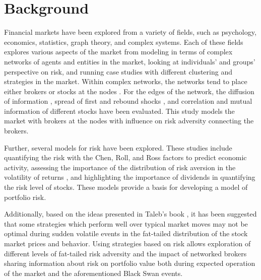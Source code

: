 \documentclass[letterpaper, 11 pt, proceedings]{IEEEtran}
\begin{document}
	\section{Background}\label{sec:background}
	Financial markets have been explored from a variety of fields, such as psychology, economics, statistics, graph theory, and complex systems. Each of these fields explores various aspects of the market  from modeling in terms of complex networks of agents and entities in the market, looking at individuals' and groups' perspective on risk, and running case studies with different clustering and strategies in the market. Within complex networks, the networks tend to place either brokers or stocks at the nodes \cite{baydelli_hierarchicalmarket,kulmann_marketscomplexsystems,dimaggio_relevancebrokernetworks,tse_networkstocks}. For the edges of the network, the diffusion of information \cite{dimaggio_relevancebrokernetworks}, spread of first and rebound shocks \cite{gai_contagion}, and correlation and mutual information of different stocks \cite{li_correlation, fiedor_networksmutualinformationrate} have been evaluated. This study models the market with brokers at the nodes with influence on risk adversity connecting the brokers. 
	
	Further, several models for risk have been explored. These studies include quantifying the risk with the Chen, Roll, and Ross factors \cite{cooper_realinvestmentandrisk} to predict economic activity, assessing the importance of the distribution of risk aversion in the volatility of returns \cite{lansing_riskaversion}, and highlighting the importance of dividends in quantifying the risk level of stocks. These models provide a basis for developing a model of portfolio risk.
	
	Additionally, based on the ideas presented in Taleb's book \cite{taleb_antifragile}, it has been suggested that some strategies which perform well over typical market moves may not be optimal during sudden volatile events in the fat-tailed distribution of the stock market prices and behavior. Using strategies based on risk allows exploration of different levels of fat-tailed risk adversity and the impact of networked brokers sharing information about risk on portfolio value both during expected operation of the market and the aforementioned Black Swan events.
	
	
\end{document}
